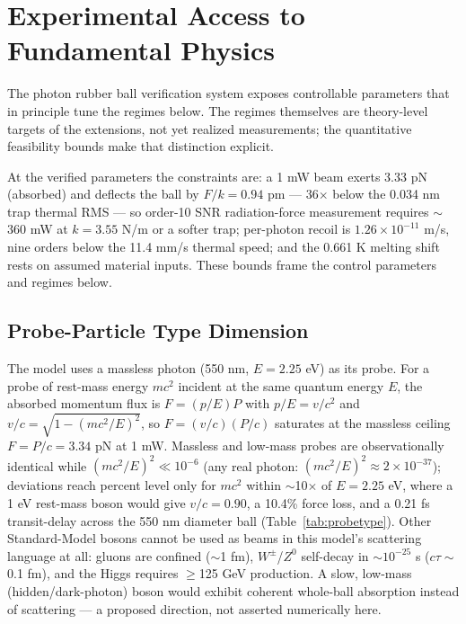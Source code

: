 \documentclass[12pt,twoside]{article}
\begin{document}
\section{Experimental Access to Fundamental Physics}\label{sec:experimental}
The photon rubber ball verification system exposes controllable parameters that in principle tune the regimes below. The regimes themselves are theory-level targets of the extensions, not yet realized measurements; the quantitative feasibility bounds make that distinction explicit.

At the verified parameters the constraints are: a 1 mW beam exerts 3.33 pN (absorbed) and deflects the ball by $F/k = 0.94$ pm — 36$\times$ below the 0.034 nm trap thermal RMS — so order-10 SNR radiation-force measurement requires $\sim$360 mW at $k = 3.55$ N/m or a softer trap; per-photon recoil is $1.26\times10^{-11}$ m/s, nine orders below the 11.4 mm/s thermal speed; and the 0.661 K melting shift rests on assumed material inputs. These bounds frame the control parameters and regimes below.

\subsection{Probe-Particle Type Dimension}\label{sec:probetype}
The model uses a massless photon (550 nm, $E=2.25$ eV) as its probe. For a probe of rest-mass energy $mc^2$ incident at the same quantum energy $E$, the absorbed momentum flux is $F=(p/E)P$ with $p/E=v/c^2$ and $v/c=\sqrt{1-(mc^2/E)^2}$, so $F=(v/c)(P/c)$ saturates at the massless ceiling $F=P/c=3.34$ pN at 1 mW. Massless and low-mass probes are observationally identical while $(mc^2/E)^2\ll10^{-6}$ (any real photon: $(mc^2/E)^2\approx2\times10^{-37}$); deviations reach percent level only for $mc^2$ within $\sim$10$\times$ of $E=2.25$ eV, where a 1 eV rest-mass boson would give $v/c=0.90$, a 10.4\% force loss, and a 0.21 fs transit-delay across the 550 nm diameter ball (Table~\ref{tab:probetype}). Other Standard-Model bosons cannot be used as beams in this model's scattering language at all: gluons are confined ($\sim$1 fm), $W^\pm$/$Z^0$ self-decay in $\sim$$10^{-25}$ s ($c\tau\sim$0.1 fm), and the Higgs requires $\geq$125 GeV production. A slow, low-mass (hidden/dark-photon) boson would exhibit coherent whole-ball absorption instead of scattering --- a proposed direction, not asserted numerically here.
\end{document}
